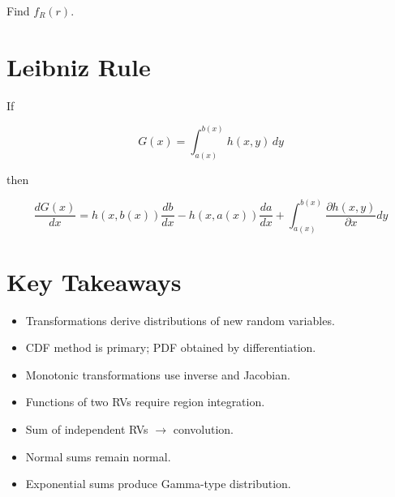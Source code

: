 \documentclass[12pt]{article}
\begin{document}
Find $f_R(r)$.

\section{Leibniz Rule}

If

\[
G(x)=\int_{a(x)}^{b(x)} h(x,y)\,dy
\]

then

\[
\frac{dG(x)}{dx}
= h(x,b(x))\frac{db}{dx}
- h(x,a(x))\frac{da}{dx}
+ \int_{a(x)}^{b(x)} \frac{\partial h(x,y)}{\partial x} dy
\]

\section{Key Takeaways}

\begin{itemize}
\item Transformations derive distributions of new random variables.
\item CDF method is primary; PDF obtained by differentiation.
\item Monotonic transformations use inverse and Jacobian.
\item Functions of two RVs require region integration.
\item Sum of independent RVs $\rightarrow$ convolution.
\item Normal sums remain normal.
\item Exponential sums produce Gamma-type distribution.
\end{itemize}
\end{document}
